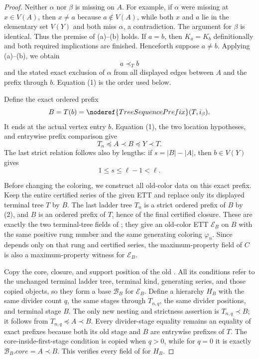 \begin{proof}
Neither $\alpha$ nor $\beta$ is missing on $A$.  For example, if
$\alpha$ were missing at $x\in V(A)$, then $x\ne a$ because
$a\notin V(A)$, while both $x$ and $a$ lie in the elementary set $V(Y)$
and both miss $\alpha$, a contradiction.  The argument for $\beta$ is
identical.  Thus the premise of (a)--(b) holds.  If $a=b$, then
$K_a=K_b$ definitionally and both required implications are finished.
Henceforth suppose $a\ne b$.  Applying (a)--(b), we obtain
\[
                         a\prec_T b                              \tag{1}
\]
and the stated exact exclusion of $\alpha$ from all displayed edges
between $A$ and the prefix through $b$.  Equation (1) is the order used
below.

Define the exact ordered prefix
\[
 B=T(b)=\noderef{TreeSequencePrefix}(T,i_\beta).
\]
It ends at the actual vertex entry $b$.  Equation (1), the two location
hypotheses, and entrywise prefix comparison give
\[
 T_n\preccurlyeq A\prec B\preccurlyeq Y\prec T.                \tag{2}
\]
The last strict relation follows also by lengths: if
$s=|B|-|A|$, then $b\in V(Y)$ gives
\[
                  1\leq s\leq\ell-1<\ell.                     \tag{3}
\]

Before changing the coloring, we construct all old-color data on this
exact prefix.  Keep the entire certified series of the given ETT and
replace only its displayed terminal tree $T$ by $B$.  The last ladder
tree $T_n$ is a strict ordered prefix of $B$ by (2), and $B$ is an
ordered prefix of $T$, hence of the final certified closure.  These are
exactly the two terminal-tree fields of
; they give an old-color ETT
$\mathcal E_B$ on $B$ with the same positive rung number and the same
generating coloring $\varphi_n$.  Since
 depends only on that rung and certified series,
the maximum-property field of $C$ is also a maximum-property witness for
$\mathcal E_B$.

Copy the core, closure, and support position of the old
.  All its conditions refer to the unchanged
terminal ladder tree, terminal kind, generating series, and those copied
objects, so they form a base $\mathcal B_B$ for $\mathcal E_B$.  Define a
hierarchy $H_B$ with the same divider count $q$, the same stages through
$T_{n,q}$, the same divider positions, and terminal stage $B$.  The only
new nesting and strictness assertion is $T_{n,q}\prec B$; it follows from
$T_{n,q}\preccurlyeq A\prec B$.  Every divider-stage equality remains an
equality of exact prefixes because both its old stage and $B$ are
entrywise prefixes of $T$.  The core-inside-first-stage condition is
copied when $q>0$, while for $q=0$ it is exactly
$\mathcal B_B.\mathit{core}=A\prec B$.  This verifies every field of
 for $H_B$.


\end{proof}
